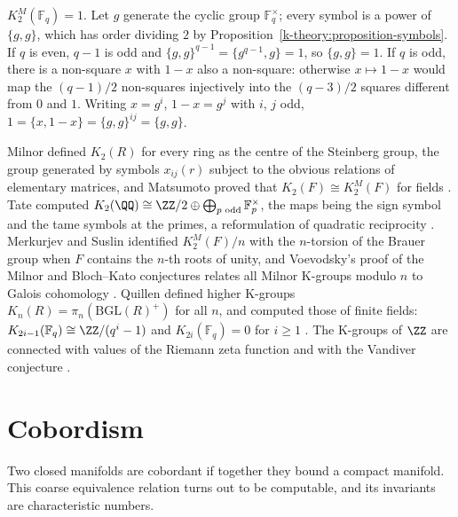 \begin{example}\label{k-theory:example-k-two-finite}
$K_2^M(\mathbb{F}_q) = 1$. Let $g$ generate the cyclic group $\mathbb{F}_q^\times$; every symbol is a power of $\{g, g\}$, which has order dividing $2$ by Proposition~\ref{k-theory:proposition-symbols}. If $q$ is even,
$q - 1$ is odd and $\{g, g\}^{q-1} = \{g^{q-1}, g\} = 1$, so $\{g, g\} = 1$. If $q$ is odd, there is a non-square $x$ with $1 - x$ also a non-square: otherwise $x \mapsto 1 - x$ would map the $(q - 1)/2$
non-squares injectively into the $(q - 3)/2$ squares different from $0$ and $1$. Writing $x = g^i$, $1 - x = g^j$ with $i$, $j$ odd, $1 = \{x, 1 - x\} = \{g, g\}^{ij} = \{g, g\}$.
\end{example}

\begin{remark}\label{k-theory:remark-higher-k-theory}
Milnor defined $K_2(R)$ for every ring as the centre of the Steinberg group, the group generated by symbols $x_{ij}(r)$ subject to the obvious relations of elementary matrices, and Matsumoto proved that
$K_2(F) \cong K_2^M(F)$ for fields \cite{milnor-algebraic-k-theory}. Tate computed $K_2(\QQ) \cong \ZZ/2 \oplus \bigoplus_{p \text{ odd}}\mathbb{F}_p^\times$, the maps being the sign symbol and the tame
symbols at the primes, a reformulation of quadratic reciprocity \cite{milnor-algebraic-k-theory}. Merkurjev and Suslin identified $K_2^M(F)/n$ with the $n$-torsion of the Brauer group when $F$ contains
the $n$-th roots of unity, and Voevodsky's proof of the Milnor and Bloch--Kato conjectures relates all Milnor K-groups modulo $n$ to Galois cohomology \cite{weibel-k-book}. Quillen defined higher K-groups
$K_n(R) = \pi_n(\mathrm{BGL}(R)^+)$ for all $n$, and computed those of finite fields: $K_{2i-1}(\mathbb{F}_q) \cong \ZZ/(q^i - 1)$ and $K_{2i}(\mathbb{F}_q) = 0$ for $i \geq 1$ \cite{quillen-1972}. The K-groups
of $\ZZ$ are connected with values of the Riemann zeta function and with the Vandiver conjecture \cite{weibel-k-book}.
\end{remark}

\section{Cobordism}\label{k-theory:section-cobordism}

Two closed manifolds are cobordant if together they bound a compact manifold. This coarse equivalence relation turns out to be computable, and its invariants are characteristic numbers.

